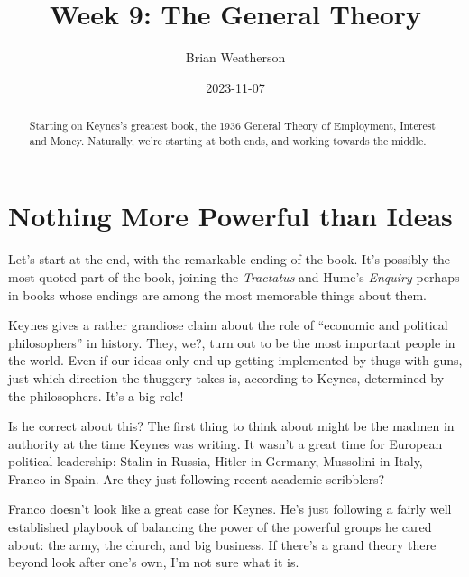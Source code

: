 \documentclass[
  11pt,
  letterpaper,
  DIV=11,
  numbers=noendperiod,
  oneside]{scrartcl}
\title{Week 9: The General Theory}
\author{Brian Weatherson}
\date{2023-11-07}
\begin{document}
\maketitle
\begin{abstract}
Starting on Keynes's greatest book, the 1936 General Theory of
Employment, Interest and Money. Naturally, we're starting at both ends,
and working towards the middle.
\end{abstract}
\section{Nothing More Powerful than
Ideas}\label{nothing-more-powerful-than-ideas}

Let's start at the end, with the remarkable ending of the book. It's
possibly the most quoted part of the book, joining the \emph{Tractatus}
and Hume's \emph{Enquiry} perhaps in books whose endings are among the
most memorable things about them.

Keynes gives a rather grandiose claim about the role of ``economic and
political philosophers'' in history. They, we?, turn out to be the most
important people in the world. Even if our ideas only end up getting
implemented by thugs with guns, just which direction the thuggery takes
is, according to Keynes, determined by the philosophers. It's a big role!

Is he correct about this? The first thing to think about might be the
madmen in authority at the time Keynes was writing. It wasn't a great
time for European political leadership: Stalin in Russia, Hitler in
Germany, Mussolini in Italy, Franco in
Spain. Are they just following recent academic scribblers?

Franco doesn't look like a great case for Keynes. He's just following a
fairly well established playbook of balancing the power of the powerful
groups he cared about: the army, the church, and big business. If
there's a grand theory there beyond look after one's own, I'm not sure
what it is.
\end{document}
